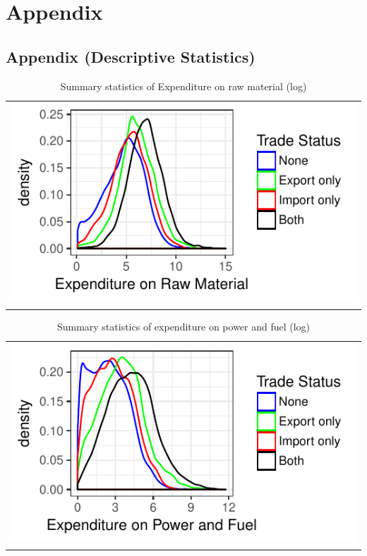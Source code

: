 \documentclass[11pt]{article}
\begin{document}
\section{Appendix}

\subsection{Appendix (Descriptive Statistics)}
\begin{center}
\begin{table}[H]
\caption{Summary statistics of Expenditure on raw material (log)}
\label{tab:lrawmat}
\begin{tabular}{c}
 \includegraphics{./PICS/denslrawmat.pdf}   \\ 
   \\  
\end{tabular}
\end{table}
\end{center}


\begin{center}
\begin{table}[H]
\caption{Summary statistics of expenditure on power and fuel (log)}
\begin{tabular}{c}
 \includegraphics{./PICS/denslpower.pdf}   \\ 
   \\  
\end{tabular}
\end{table}
\end{center}
\end{document}
